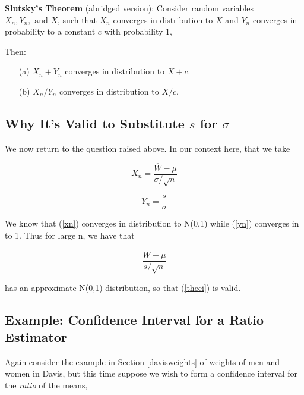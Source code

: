 \begin{theorem}

{\bf Slutsky's Theorem} (abridged version):  Consider random variables
$X_n, Y_n, \textrm{ and } X$, such that $X_n$ converges in distribution
to $X$ and $Y_n$ converges in probability to a constant $c$ with
probability 1,   

Then:

\begin{itemize}

\item [(a)] $X_n + Y_n$ converges in distribution to $X+c$.

\item [(b)] $X_n / Y_n$ converges in distribution to $X/c$.

\end{itemize}

\end{theorem}

\subsection{Why It's Valid to Substitute $s$ for $\sigma$}

We now return to the question raised above.  In our context here, that
we take

\begin{equation}
\label{xn}
X_n = \frac{\overline{W}-\mu}
{\sigma/\sqrt{n}}
\end{equation}

\begin{equation}
\label{yn}
Y_n = \frac{s}{\sigma}
\end{equation}

We know that (\ref{xn}) converges in distribution to N(0,1) while
(\ref{yn}) converges in to 1.  Thus for large n, we have that 

\begin{equation}
\frac{\overline{W}-\mu} {s/\sqrt{n}}
\end{equation}

has an approximate N(0,1) distribution, so that (\ref{theci}) is valid.

\subsection{Example:  Confidence Interval for a Ratio Estimator}

Again consider the example in Section \ref{davisweights} of weights of
men and women in Davis, but this time suppose we wish to form a
confidence interval for the {\it ratio} of the means,

